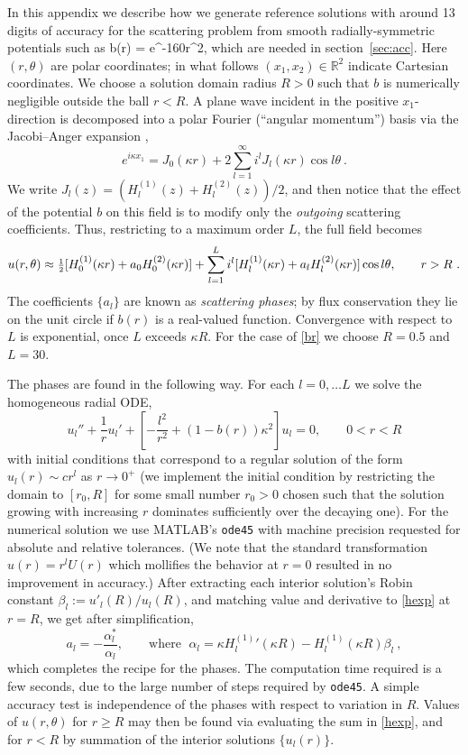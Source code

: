 \documentclass[11pt,final]{amsart}
\theoremstyle{definition}
\numberwithin{remark}{section}
\numberwithin{definition}{section}
\numberwithin{pro}{section}
\begin{document}
In this appendix we describe how we generate reference solutions
with around 13 digits of accuracy
for the scattering problem from smooth radially-symmetric
potentials
such as
\be
b(r) =  e^{-160r^2},
\label{br}
\ee
which are needed in section~\ref{sec:acc}.
Here $(r,\theta)$ are polar coordinates;
in what follows $(x_1,x_2)\in\mathbb{R}^2$ indicate Cartesian coordinates.
We choose a solution domain radius
$R>0$ such that $b$ is numerically negligible outside the ball $r<R$.
A plane wave incident in the positive $x_1$-direction
is decomposed into a polar Fourier (``angular momentum'') basis via the Jacobi--Anger expansion \cite[10.12.5]{dlmf},
$$
e^{i\kappa x_1} = J_0(\kappa r) + 2 \sum_{l=1}^\infty i^l J_l(\kappa r)\cos l\theta
~.
$$
We write $J_l(z) = (H^{(1)}_l(z) + H^{(2)}_l(z))/2$,
and then notice that the effect of the potential $b$ on this field is
to modify only the {\em outgoing} scattering coefficients.
Thus, restricting to a maximum order $L$, the full field becomes
\begin{equation}
u(r,\theta) \approx \mbox{\small $\frac{1}{2}$}[H^{(1)}_0(\kappa r) + a_0 H^{(2)}_0(\kappa r)]
+ \sum_{l=1}^L i^l [H^{(1)}_l(\kappa r) + a_l H^{(2)}_l(\kappa r)] \cos l\theta,
\qquad
r>R~.
\label{hexp}
\end{equation}
The coefficients $\{a_l\}$ are known as {\em scattering phases};
by flux conservation they lie on the unit circle if $b(r)$ is a real-valued
function.
Convergence with respect to $L$ is exponential,
once $L$ exceeds $\kappa R$.
For the case of \eqref{br} we choose $R=0.5$ and $L=30$.

The phases are found in the following way. %
For each $l=0,\dots L$ we solve the homogeneous radial ODE,
$$
u_l'' + \frac{1}{r} u_l' + \left[ -\frac{l^2}{r^2} + \left( 1 - b(r)\right)\kappa^2\right] u_l = 0,
\qquad 0<r<R
$$
with initial conditions that correspond to a regular solution
of the form $u_l(r) \sim c r^l$ as $r\to 0^+$
(we implement the initial condition
by restricting the domain to $[r_0,R]$ for some small number
$r_0>0$ chosen such that the solution growing with increasing $r$
dominates sufficiently over the decaying one).
For the numerical solution we use
MATLAB's {\tt ode45} with machine precision requested for absolute
and relative tolerances.
(We note that the standard transformation $u(r) = r^lU(r)$ which mollifies the behavior at $r=0$ resulted in no improvement in accuracy.)
After extracting each interior
solution's Robin constant $\beta_l := u'_l(R)/u_l(R)$,
and matching value and derivative to \eqref{hexp} at $r=R$,
we get after simplification,
$$a_l = -\frac{\alpha_l^\ast}{\alpha_l},
\qquad \mbox{where } \;
\alpha_l = \kappa {H^{(1)}_l}'(\kappa R) - H^{(1)}_l(\kappa R) \beta_l
~,
$$
which completes the recipe for the phases.
%
The computation time required is a few seconds, due to the large number
of steps required by {\tt ode45}.
A simple accuracy test is independence of the phases with respect to variation
in $R$.
Values of $u(r,\theta)$ for $r\ge R$ may then be found via evaluating the sum
in \eqref{hexp}, and for $r<R$ by summation of the interior
solutions $\{u_l(r)\}$.
\end{document}
